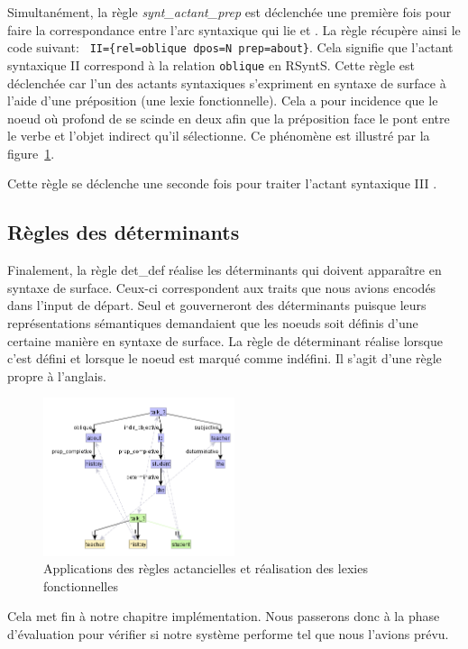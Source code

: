 Simultanément, la règle \emph{synt\_actant\_prep} est déclenchée une première fois pour faire la correspondance entre l'arc syntaxique qui lie  et . La règle récupère ainsi le code suivant: \lstinline! II={rel=oblique dpos=N prep=about}!. Cela signifie que l'actant syntaxique II correspond à la relation \texttt{oblique} en RSyntS. Cette règle est déclenchée car l'un des actants syntaxiques s'expriment en syntaxe de surface à l'aide d'une préposition (une lexie fonctionnelle). Cela a pour incidence que le noe{}ud où profond de  se scinde en deux afin que la préposition  face le pont entre le verbe et l'objet indirect qu'il sélectionne. Ce phénomène est illustré par la figure~\ref{deroulement4}. 

Cette règle se déclenche une seconde fois pour traiter l'actant syntaxique III .

\subsection{Règles des déterminants}
Finalement, la règle det\_def réalise les déterminants qui doivent apparaître en syntaxe de surface. Ceux-ci correspondent aux traits que nous avions encodés dans l'input de départ. Seul  et  gouverneront des déterminants puisque leurs représentations sémantiques demandaient que les noe{}uds soit définis d'une certaine manière en syntaxe de surface. La règle de déterminant réalise  lorsque c'est défini et  lorsque le noe{}ud est marqué comme indéfini. Il s'agit d'une règle propre à l'anglais.
\begin{figure}[htb]
	\centering
	\includegraphics[width=0.5\textwidth, trim = {0cm 0cm 0cm 0cm},clip]{ch6/figs/ssynt.png}
	\caption{Applications des règles actancielles et réalisation des lexies fonctionnelles}
	\label{deroulement4}
\end{figure}
Cela met fin à notre chapitre implémentation. Nous passerons donc à la phase d'évaluation pour vérifier si notre système performe tel que nous l'avions prévu.